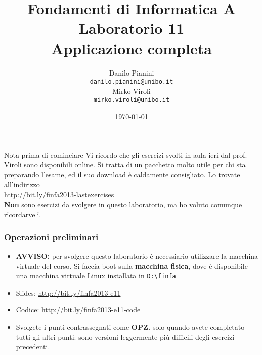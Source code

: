 \documentclass{beamer}
\begin{document}
\title[Lab1 - FV]{Fondamenti di Informatica A \\ Laboratorio 11 \\ Applicazione completa}
\author[Danilo Pianini]{Danilo Pianini\\\texttt{danilo.pianini@unibo.it} \\ \vspace{3pt} Mirko Viroli\\\texttt{mirko.viroli@unibo.it} }
\date[\today]{\today}

\frame{\titlepage} 

\begin{frame}[fragile]{Nota prima di cominciare}
Vi ricordo che gli esercizi svolti in aula ieri dal prof. Viroli sono disponibili online. Si tratta di un pacchetto molto utile per chi sta preparando l'esame, ed il suo download è caldamente consigliato. Lo trovate all'indirizzo \\ \url{http://bit.ly/finfa2013-lastexercises} \\
\textbf{Non} sono esercizi da svolgere in questo laboratorio, ma ho voluto comunque ricordarveli.
\end{frame}

\begin{frame}[fragile]
\frametitle{Operazioni preliminari}
\begin{itemize}
 \item \textbf{AVVISO:} per svolgere questo laboratorio è necessiario utilizzare la macchina virtuale del corso. Si faccia boot sulla \textbf{macchina fisica}, dove è disponibile una macchina virtuale Linux installata in \texttt{D:\textbackslash{}finfa}
 \item Slides: \url{http://bit.ly/finfa2013-e11}
 \item Codice: \url{http://bit.ly/finfa2013-e11-code}
 \item Svolgete i punti contrassegnati come \textbf{OPZ.} solo quando avete completato tutti gli altri punti: sono versioni leggermente più difficili degli esercizi precedenti.
\end{itemize}
\end{frame}
\end{document}
